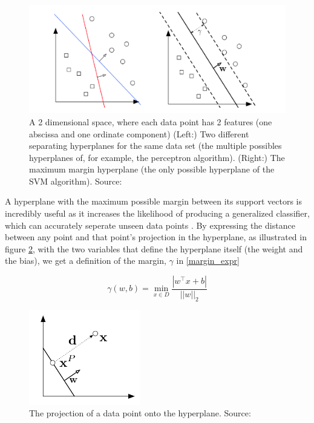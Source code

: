 \begin{figure}
    \centering
    \includegraphics[width=0.75\linewidth]{images/hyperplane.png}
    \caption{A 2 dimensional space, where each data point has 2 features (one abscissa and one ordinate component) (Left:) Two different separating hyperplanes for the same data set (the multiple possibles hyperplanes of, for example, the perceptron algorithm). (Right:) The maximum margin hyperplane (the only possible hyperplane of the SVM algorithm). Source: \cite{cornell_svm_notes}}
    \label{fig:hyperplane}
\end{figure}

A hyperplane with the maximum possible margin between its support vectors is incredibly useful as it increases the likelihood of producing a generalized classifier, which can accurately seperate unseen data points \cite{cornell_svm}. By expressing the distance between any point and that point's projection in the hyperplane, as illustrated in figure \ref{fig:hyperplane_geometry}, with the two variables that define the hyperplane itself (the weight and the bias), we get a definition of the margin, $\gamma$ in \ref{margin_expr} \cite{cornell_svm_notes}

\begin{equation}\label{margin_expr}
    \gamma(w,b)=\min_{x\in D} \frac{|w^\top x + b|}{||w||_{2}}
\end{equation}

\begin{figure}
    \centering
    \includegraphics[width=0.35\linewidth]{images/hyperplane_geometry.png}
    \caption{The projection of a data point onto the hyperplane. Source: \cite{cornell_svm_notes}}
    \label{fig:hyperplane_geometry}
\end{figure}

